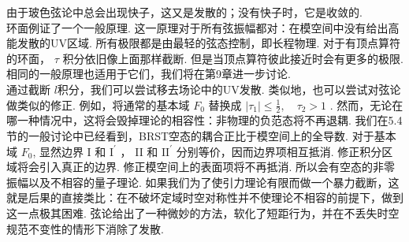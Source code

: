 由于玻色弦论中总会出现快子，这又是发散的；没有快子时，它是收敛的.\\
环面例证了一个一般原理. 这一原理对于所有弦振幅都对：在模空间中没有给出高能发散的UV区域. 所有极限都是由最轻的弦态控制，即长程物理. 对于有顶点算符的环面， $\tau$ 积分依旧像上面那样截断. 但是当顶点算符彼此接近时会有更多的极限. 相同的一般原理也适用于它们，我们将在第9章进一步讨论. \\
通过截断 $l$积分，我们可以尝试移去场论中的UV发散. 类似地，也可以尝试对弦论做类似的修正. 例如，将通常的基本域 $F_{0}$ 替换成 $\left|\tau_{1}\right| \leq \frac{1}{2}, \quad \tau_{2}>1$ . 然而，无论在哪一种情况中，这将会毁掉理论的相容性：非物理的负范态将不再退耦. 我们在5.4节的一般讨论中已经看到，BRST空态的耦合正比于模空间上的全导数. 对于基本域 $F_{0}$, 显然边界 I 和 $\mathrm{I}^{\prime}$ ， II 和 $\mathrm{II}^{\prime}$ 分别等价，因而边界项相互抵消. 修正积分区域将会引入真正的边界. 修正模空间上的表面项将不再抵消. 所以会有空态的非零振幅以及不相容的量子理论. 如果我们为了使引力理论有限而做一个暴力截断，这就是后果的直接类比：在不破坏定域时空对称性并不使理论不相容的前提下，做到这一点极其困难. 弦论给出了一种微妙的方法，软化了短距行为，并在不丢失时空规范不变性的情形下消除了发散.\\ 

